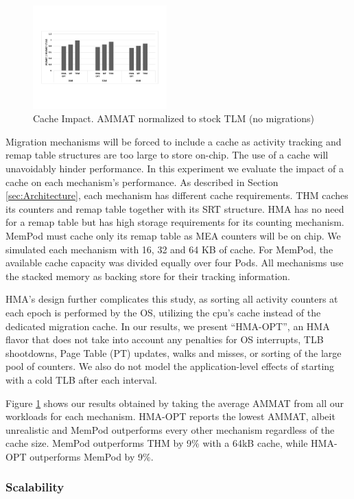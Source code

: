 \begin{figure}
  \includegraphics[width=0.46\textwidth]{figures/cache_impact.pdf}
  \caption{Cache Impact. AMMAT normalized to stock TLM (no migrations)}
  \label{fig:cache}
\end{figure}

Migration mechanisms will be forced to include a cache as activity tracking and remap table structures are too large to store on-chip. The use of a cache will unavoidably hinder performance. In this experiment we evaluate the impact of a cache on each mechanism's performance. As described in Section \ref{sec:Architecture}, each mechanism has different cache requirements. THM caches its counters and remap table together with its SRT structure. HMA has no need for a remap table but has high storage requirements for its counting mechanism. MemPod must cache only its remap table as MEA counters will be on chip. We simulated each mechanism with 16, 32 and 64 KB of cache. For MemPod, the available cache capacity was divided equally over four Pods. All mechanisms use the stacked memory as backing store for their tracking information.

HMA's design further complicates this study, as sorting all activity counters at each epoch is performed by the OS, utilizing the cpu's cache instead of the dedicated migration cache. In our results, we present ``HMA-OPT'', an HMA flavor that does not take into account any penalties for OS interrupts, TLB shootdowns, Page Table (PT) updates, walks and misses, or sorting of the large
pool of counters.
We also do not model the application-level effects of starting with a cold TLB after each interval.

Figure \ref{fig:cache} shows our results obtained by taking the average AMMAT from all our workloads for each mechanism. HMA-OPT reports the lowest AMMAT, albeit unrealistic and MemPod outperforms every other mechanism regardless of the cache size. MemPod outperforms THM by 9\% with a 64kB cache, while HMA-OPT outperforms MemPod by 9\%.

\subsubsection{Scalability}

